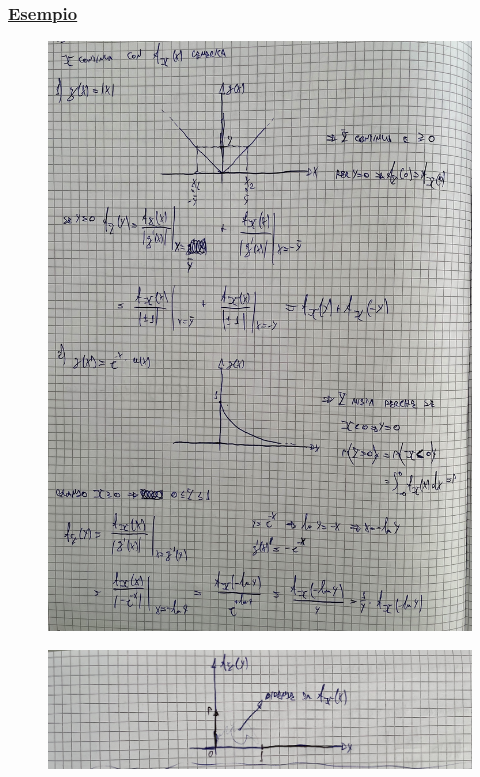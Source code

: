 \documentclass{article}
\begin{document}
\subsubsection{\underline{Esempio}}
\begin{figure}[ht]
\centering
\includegraphics[scale=0.10]{ese/27.jpeg}
\end{figure}
\begin{figure}[ht]
\centering
\includegraphics[scale=0.10]{ese/27a.jpeg}
\end{figure}
\end{document}
